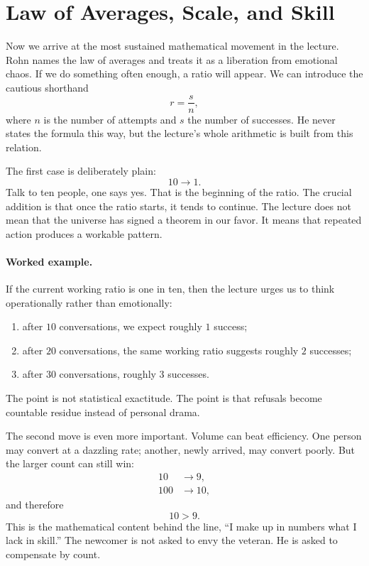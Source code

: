 \section{Law of Averages, Scale, and Skill}

Now we arrive at the most sustained mathematical movement in the lecture. Rohn names the law of averages and treats it as a liberation from emotional chaos. If we do something often enough, a ratio will appear. We can introduce the cautious shorthand
\begin{equation}
r = \frac{s}{n},
\end{equation}
where \(n\) is the number of attempts and \(s\) the number of successes. He never states the formula this way, but the lecture's whole arithmetic is built from this relation.

The first case is deliberately plain:
\begin{equation}
10 \to 1.
\end{equation}
Talk to ten people, one says yes. That is the beginning of the ratio. The crucial addition is that once the ratio starts, it tends to continue. The lecture does not mean that the universe has signed a theorem in our favor. It means that repeated action produces a workable pattern.

\paragraph{Worked example.} If the current working ratio is one in ten, then the lecture urges us to think operationally rather than emotionally:
\begin{enumerate}
\item after \(10\) conversations, we expect roughly \(1\) success;
\item after \(20\) conversations, the same working ratio suggests roughly \(2\) successes;
\item after \(30\) conversations, roughly \(3\) successes.
\end{enumerate}
The point is not statistical exactitude. The point is that refusals become countable residue instead of personal drama.

The second move is even more important. Volume can beat efficiency. One person may convert at a dazzling rate; another, newly arrived, may convert poorly. But the larger count can still win:
\begin{align}
10 &\to 9,\\
100 &\to 10,
\end{align}
and therefore
\begin{equation}
10 > 9.
\end{equation}
This is the mathematical content behind the line, ``I make up in numbers what I lack in skill.'' The newcomer is not asked to envy the veteran. He is asked to compensate by count.


